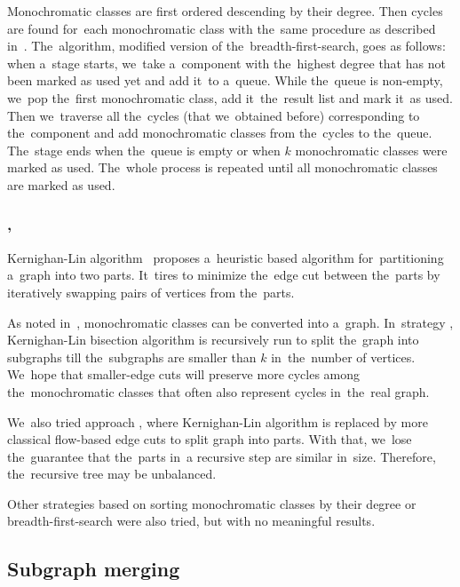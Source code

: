 Monochromatic classes are first ordered descending by their degree.
Then cycles are found for~each monochromatic class with the~same procedure
as described in~.
The~algorithm, modified version of the~breadth-first-search, goes as follows:
when a~stage starts, we~take a~component with the~highest degree
that has not been marked as used yet and add it~to a~queue.
While the~queue is non-empty, we~pop the~first monochromatic class,
add it~the~result list and mark it~as used.
Then we~traverse all the~cycles (that we~obtained before)
corresponding to the~component
and add monochromatic classes from the~cycles to the~queue.
The~stage ends when the~queue is empty or when \( k \) monochromatic classes
were marked as used. The~whole process is repeated until
all monochromatic classes are marked as used.

\subsubsection*{\KernighanLin{}, \Cuts{}}

Kernighan-Lin algorithm~\cite{kernighan_lin} proposes a~heuristic based algorithm
for~partitioning a~graph into two parts. It~tires to minimize the~edge cut between
the~parts by iteratively swapping pairs of vertices from the~parts.

As noted in~,
monochromatic classes can be converted into a~graph.
In~strategy \KernighanLin{},
Kernighan-Lin bisection algorithm is recursively run to split the~graph
into subgraphs till the~subgraphs are smaller than \( k \) in~the~number of vertices.
We~hope that smaller-edge cuts will preserve more cycles among
the~monochromatic classes that often also represent cycles in~the~real graph.

We~also tried approach \Cuts{}, where Kernighan-Lin algorithm is replaced by
more classical flow-based edge cuts to split graph into parts.
With that, we~lose the~guarantee that the~parts in~a recursive step
are similar in~size. Therefore, the~recursive tree may be unbalanced.

Other strategies based on
sorting monochromatic classes by their degree
or breadth-first-search were also tried,
but with no meaningful results.



\subsection{Subgraph merging}%
\label{sec:merging}

